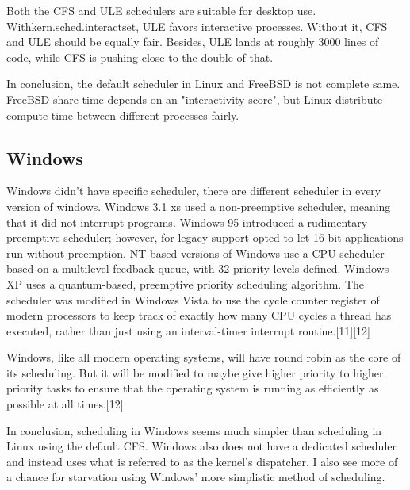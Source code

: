 \documentclass[onecolumn, draftclsnofoot,10pt, compsoc]{IEEEtran}
\begin{document}
Both the CFS and ULE schedulers are suitable for desktop use. Withkern.sched.interactset, ULE favors interactive processes. Without it, CFS and ULE should be equally fair. Besides, ULE lands at roughly 3000 lines of code, while CFS is pushing close to the double of that.

In conclusion, the default scheduler in Linux and FreeBSD is not complete same. FreeBSD share time depends on an "interactivity score", but Linux distribute compute time between different processes fairly.

\subsection{Windows}
Windows didn’t have specific scheduler, there are different scheduler in every version of windows. Windows 3.1 xs used a non-preemptive scheduler, meaning that it did not interrupt programs. Windows 95 introduced a rudimentary preemptive scheduler; however, for legacy support opted to let 16 bit applications run without preemption. NT-based versions of Windows use a CPU scheduler based on a multilevel feedback queue, with 32 priority levels defined. Windows XP uses a quantum-based, preemptive priority scheduling algorithm. The scheduler was modified in Windows Vista to use the cycle counter register of modern processors to keep track of exactly how many CPU cycles a thread has executed, rather than just using an interval-timer interrupt routine.[11][12]

Windows, like all modern operating systems, will have round robin as the core of its scheduling. But it will be modified to maybe give higher priority to higher priority tasks to ensure that the operating system is running as efficiently as possible at all times.[12]

In conclusion, scheduling in Windows seems much simpler than scheduling in Linux using the default CFS. Windows also does not have a dedicated scheduler and instead uses what is referred to as the kernel's dispatcher. I also see more of a chance for starvation using Windows' more simplistic method of scheduling.

\newpage
\end{document}
